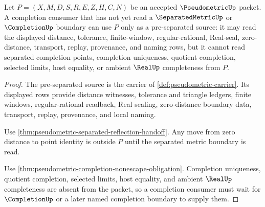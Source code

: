\begin{theorem}
\label{thm:pseudometric-preseparated-completion-source}
Let $P=(X,M,D,S,R,E,Z,H,C,N)$ be an accepted $\PseudometricUp$ packet. A completion consumer that has not yet read a $\SeparatedMetricUp$ or $\CompletionUp$ boundary can use $P$ only as a pre-separated source: it may read the displayed distance, tolerance, finite-window, regular-rational, Real-seal, zero-distance, transport, replay, provenance, and naming rows, but it cannot read separated completion points, completion uniqueness, quotient completion, selected limits, host equality, or ambient $\RealUp$ completeness from $P$.
\end{theorem}
\begin{proof}
The pre-separated source is the carrier of \autoref{def:pseudometric-carrier}. Its displayed rows provide distance witnesses, tolerance and triangle ledgers, finite windows, regular-rational readback, Real sealing, zero-distance boundary data, transport, replay, provenance, and local naming.

Use \autoref{thm:pseudometric-separated-reflection-handoff}. Any move from zero distance to point identity is outside $P$ until the separated metric boundary is read.

Use \autoref{thm:pseudometric-completion-nonescape-obligation}. Completion uniqueness, quotient completion, selected limits, host equality, and ambient $\RealUp$ completeness are absent from the packet, so a completion consumer must wait for $\CompletionUp$ or a later named completion boundary to supply them.
\end{proof}

